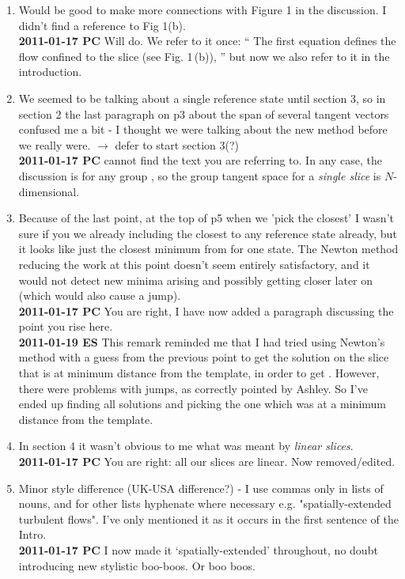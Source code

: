 \begin{description}
\begin{enumerate}
  \item Would be good to make more connections with Figure 1 in the
  discussion.  I didn't find a reference to Fig 1(b).
    \\
  {\bf 2011-01-17 PC} Will do. We refer to it once: ``
The first
equation defines the flow confined to the slice (see
Fig. 1\,(b)), '' but now we also refer to it in the introduction.

  \item We seemed to be talking about a single reference state until
  section 3, so in section 2 the last paragraph on p3 about the span of
  several tangent vectors confused me a bit - I thought we were talking
  about the new method before we really were. $\to$ defer to start section
  3(?)
    \\
  {\bf 2011-01-17 PC} cannot find the text you are referring to. In any case,
  the discussion is for any group \Group, so the group tangent space for a
  \emph{single slice} is $N$-dimensional.

  \item Because of the last point, at the top of p5 when we 'pick the
  closest' I wasn't sure if you we already including the closest to any
  reference state already, but it looks like just the closest minimum
  from for one state.  The Newton method reducing the work at this point
  doesn't seem entirely satisfactory, and it would not detect new minima
  arising and possibly getting closer later on (which would also cause a
  jump).
    \\
  {\bf 2011-01-17 PC}
You are right, I have now added a paragraph discussing the point you rise
here.
    \\
  {\bf 2011-01-19 ES}
This remark reminded me that I had tried using Newton's method with
a guess from the previous point to get the solution on the slice
that is at minimum distance from the template, in order
to get . However, there were problems with jumps,
as correctly pointed by Ashley. So I've ended up finding all solutions
and picking the one which was at a minimum distance from the template.

  \item In section 4 it wasn't obvious to me what was meant by {\em linear slices}.
    \\
  {\bf 2011-01-17 PC} You are right: all our slices are linear.
  Now removed/edited.

  \item Minor style difference (UK-USA difference?) - I use commas only
  in lists of nouns, and for other lists hyphenate where necessary e.g.
  "spatially-extended turbulent flows".  I've only mentioned it as it
  occurs in the first sentence of the Intro.
    \\
  {\bf 2011-01-17 PC}
I now made it `spatially-extended' throughout, no doubt introducing
new stylistic boo-boos. Or boo boos.


\end{enumerate}
\end{description}
